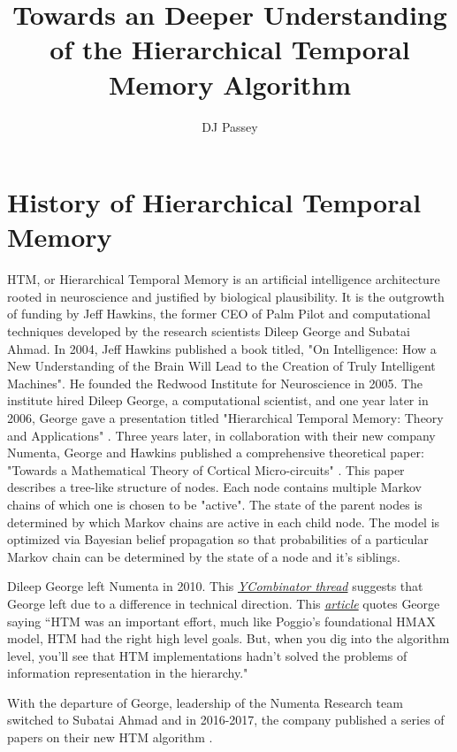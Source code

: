 \documentclass{article}
\begin{document}
 
\title{Towards an Deeper Understanding of the Hierarchical Temporal Memory Algorithm}
\author{DJ Passey}
\maketitle

\section*{History of Hierarchical Temporal Memory}
HTM, or Hierarchical Temporal Memory is an artificial intelligence architecture rooted in neuroscience and justified by biological plausibility. It is the outgrowth of funding by Jeff Hawkins, the former CEO of Palm Pilot and computational techniques developed by the research scientists Dileep George and Subatai Ahmad. In 2004, Jeff Hawkins published a book titled, "On Intelligence: How a New Understanding of the Brain Will Lead to the Creation of Truly Intelligent Machines". He founded the Redwood Institute for Neuroscience in 2005. The institute hired Dileep George, a computational scientist, and one year later in 2006, George gave a presentation titled "Hierarchical Temporal Memory: Theory and Applications" \cite{George2006}. Three years later, in collaboration with their new company Numenta, George and Hawkins published a comprehensive theoretical paper: "Towards a Mathematical Theory of Cortical Micro-circuits" \cite{George2009}. This paper describes a tree-like structure of nodes. Each node contains multiple Markov chains of which one is chosen to be "active". The state of the parent nodes is determined by which 
Markov chains are active in each child node. The model is optimized via  Bayesian belief propagation so that probabilities of a particular Markov chain can be determined by the state of a node and it's siblings. 

Dileep George left Numenta in 2010. This \textit{\href{https://news.ycombinator.com/item?id=7443016}{YCombinator thread}} suggests that George left due to a difference in technical direction. This \href{https://www.kurzweilai.net/vicarious-announces-15-million-funding-for-ai-software-based-on-the-brain}{\textit{article}} quotes George saying ``HTM was an important effort, much like Poggio’s foundational HMAX model, HTM had the right high level goals. But, when you dig into the algorithm level, you’ll see that HTM implementations hadn’t solved the problems of information representation in the hierarchy."

With the departure of George, leadership of the Numenta Research team switched to Subatai Ahmad and in 2016-2017, the company published a series of papers on their new HTM algorithm \cite{Cui2016b, Cui2016, Cui2017, Hawkins2016}.
\end{document}
